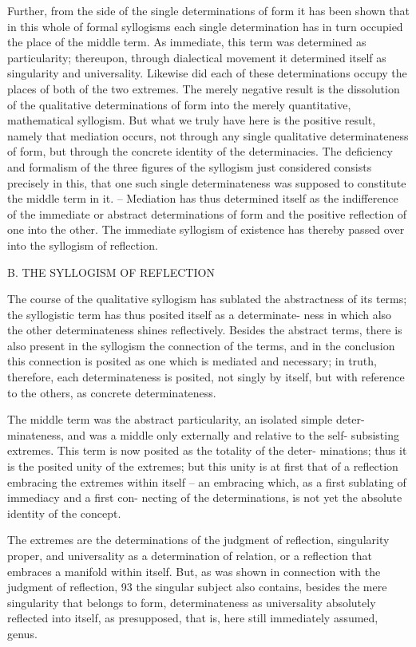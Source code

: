 Further, from the side of the single determinations of form it has been
shown that in this whole of formal syllogisms each single determination
has in turn occupied the place of the middle term. As immediate, this term
was determined as particularity; thereupon, through dialectical movement
it determined itself as singularity and universality. Likewise did each of
these determinations occupy the places of both of the two extremes. The
merely negative result is the dissolution of the qualitative determinations
of form into the merely quantitative, mathematical syllogism. But what
we truly have here is the positive result, namely that mediation occurs, not
through any single qualitative determinateness of form, but through the
concrete identity of the determinacies. The deficiency and formalism of the
three figures of the syllogism just considered consists precisely in this, that
one such single determinateness was supposed to constitute the middle
term in it. – Mediation has thus determined itself as the indifference of the
immediate or abstract determinations of form and the positive reflection
of one into the other. The immediate syllogism of existence has thereby
passed over into the syllogism of reflection.

B. THE SYLLOGISM OF REFLECTION

The course of the qualitative syllogism has sublated the abstractness of
its terms; the syllogistic term has thus posited itself as a determinate-
ness in which also the other determinateness shines reflectively. Besides
the abstract terms, there is also present in the syllogism the connection of
the terms, and in the conclusion this connection is posited as one which
is mediated and necessary; in truth, therefore, each determinateness is
posited, not singly by itself, but with reference to the others, as concrete
determinateness.

The middle term was the abstract particularity, an isolated simple deter-
minateness, and was a middle only externally and relative to the self-
subsisting extremes. This term is now posited as the totality of the deter-
minations; thus it is the posited unity of the extremes; but this unity
is at first that of a reflection embracing the extremes within itself –
an embracing which, as a first sublating of immediacy and a first con-
necting of the determinations, is not yet the absolute identity of the
concept.

The extremes are the determinations of the judgment of reflection,
singularity proper, and universality as a determination of relation, or a
reflection that embraces a manifold within itself. But, as was shown in
connection with the judgment of reflection, 93 the singular subject also
contains, besides the mere singularity that belongs to form, determinateness
as universality absolutely reflected into itself, as presupposed, that is, here
still immediately assumed, genus.

